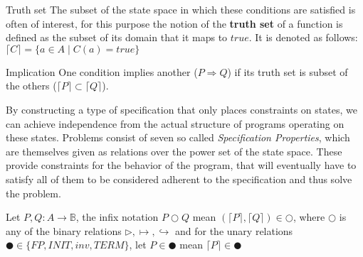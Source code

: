 \begin{definition}{Truth set}
\label{def:truth-set}
The subset of the state space in which these conditions are satisfied is often of interest, for this purpose the notion of the \textbf{truth set} of a function is defined as the subset of its domain that it maps to $true$. It is denoted as follows: $\lceil C \rceil = \{a \in A \;|\; C(a) = true\}$
\end{definition}

\begin{definition}{Implication}
\label{def:implication}
One condition implies another ($P \Rightarrow Q$) if its truth set is subset of the others ($\lceil P \rceil \subset \lceil Q \rceil$).
\end{definition}

By constructing a type of specification that only places constraints on states, we can achieve independence from the actual structure of programs operating on these states. Problems consist of seven so called \textit{Specification Properties}, which are themselves given as relations over the power set of the state space. These provide constraints for the behavior of the program, that will eventually have to satisfy all of them to be considered adherent to the specification and thus solve the problem.

Let $P, Q : A \to \mathbb{B}$, the infix notation $P \Circle Q$ mean $(\lceil P
\rceil , \lceil Q \rceil) \in \Circle$, where $\Circle$ is any of the binary
relations $\rhd, \mapsto, \hookrightarrow$ and for the unary relations $\CIRCLE
\in \{FP, INIT, inv, TERM\}$, let $P \in \CIRCLE$ mean $\lceil P \rceil \in
\CIRCLE$

